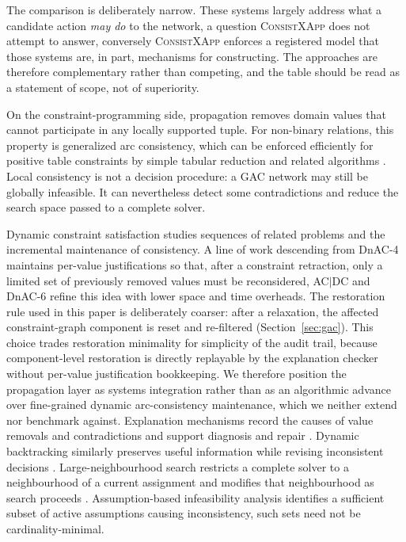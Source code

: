 \documentclass[pdflatex,sn-mathphys-num,iicol,oneside]{sn-jnl}
\newcommand{\method}{\textsc{ConsistXApp}\xspace}
\newcommand{\gac}{\textsc{GAC}\xspace}
\begin{document}
The comparison is deliberately narrow. These systems largely address
what a candidate action \emph{may do} to the network, a question
\method does not attempt to answer, conversely \method enforces a
registered model that those systems are, in part, mechanisms for
constructing. The approaches are therefore complementary rather than
competing, and the table should be read as a statement of scope, not
of superiority.

On the constraint-programming side, propagation removes domain values
that cannot participate in any locally supported tuple. For
non-binary relations, this property is generalized arc consistency,
which can be enforced efficiently for positive table constraints by
simple tabular reduction and related algorithms
\cite{yap2020gac,lecoutre2011str2}. Local consistency is not a
decision procedure: a \gac network may still be globally infeasible.
It can nevertheless detect some contradictions and reduce the search
space passed to a complete solver.

Dynamic constraint satisfaction studies sequences of related
problems and the incremental maintenance of consistency. A line of
work descending from DnAC-4 \cite{bessiere1991dynamic} maintains
per-value justifications so that, after a constraint retraction, only
a limited set of previously removed values must be reconsidered, AC$|$DC
\cite{berlandier1994acdc} and DnAC-6 \cite{debruyne1996dnac6} refine
this idea with lower space and time overheads. The restoration rule
used in this paper is deliberately coarser: after a relaxation, the
affected constraint-graph component is reset and re-filtered
(Section~\ref{sec:gac}). This choice trades restoration minimality
for simplicity of the audit trail, because component-level
restoration is directly replayable by the explanation checker without
per-value justification bookkeeping. We therefore position the
propagation layer as systems integration rather than as an
algorithmic advance over fine-grained dynamic arc-consistency
maintenance, which we neither extend nor benchmark against.
Explanation mechanisms record the causes
of value removals and contradictions and support diagnosis and
repair \cite{gupta2021explanations}. Dynamic backtracking
similarly preserves useful information while revising inconsistent
decisions \cite{ginsberg1993dynamic}. Large-neighbourhood search restricts a
complete solver to a neighbourhood of a current assignment and
modifies that neighbourhood as search proceeds
\cite{shaw1998lns}. Assumption-based infeasibility analysis identifies
a sufficient subset of active assumptions causing inconsistency, such
sets need not be cardinality-minimal.
\end{document}
